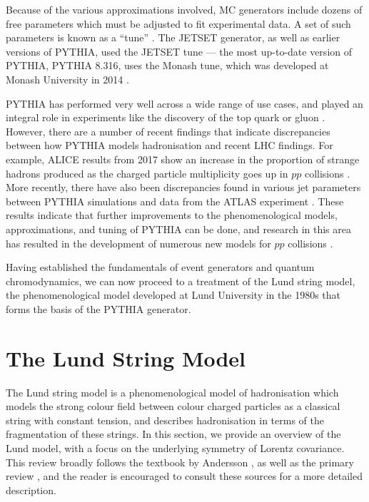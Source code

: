 \documentclass[12pt,a4paper]{report}
\begin{document}
Because of the various approximations involved, MC generators include dozens of free parameters which must be adjusted to fit experimental data. A set of such parameters is known as a ``tune'' \cite{Bierlich:2022pfr,Buckley:2011ms}. The JETSET generator, as well as earlier versions of PYTHIA, used the JETSET tune --- the most up-to-date version of PYTHIA, PYTHIA 8.316, uses the Monash tune, which was developed at Monash University in 2014 \cite{Bierlich:2022pfr,Skands:2014pea}.

PYTHIA has performed very well across a wide range of use cases, and played an integral role in experiments like the discovery of the top quark \cite{CDF:1995wbb, D0:1995jca} or gluon \cite{JADE:1979rke}. However, there are a number of recent findings that indicate discrepancies between how PYTHIA models hadronisation and recent LHC findings. For example, ALICE results from 2017 show an increase in the proportion of strange hadrons produced as the charged particle multiplicity goes up in $pp$ collisions \cite{ALICE:2016fzo}. More recently, there have also been discrepancies found in various jet parameters between PYTHIA simulations and data from the ATLAS experiment \cite{ATLAS:2024png}. These results indicate that further improvements to the phenomenological models, approximations, and tuning of PYTHIA can be done, and research in this area has resulted in the development of numerous new models for $pp$ collisions \cite{Altmann:2024odn,Bierlich:2014xba,WIP,Bergman}.

Having established the fundamentals of event generators and quantum chromodynamics, we can now proceed to a treatment of the Lund string model, the phenomenological model developed at Lund University in the 1980s that forms the basis of the PYTHIA generator.

\section{The Lund String Model}
\label{sec:lsm}

The Lund string model is a phenomenological model of hadronisation which models the strong colour field between colour charged particles as a classical string with constant tension, and describes hadronisation in terms of the fragmentation of these strings. In this section, we provide an overview of the Lund model, with a focus on the underlying symmetry of Lorentz covariance. This review broadly follows the textbook by Andersson \cite{Andersson:1997xwk}, as well as the primary review \cite{Andersson:1983ia}, and the reader is encouraged to consult these sources for a more detailed description.
\end{document}
